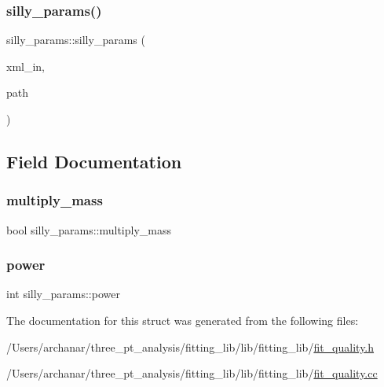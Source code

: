 \mbox{\label{structsilly__params_ac35c06fe1d98266d231e8315a2f0a5b6}} 
\subsubsection{\texorpdfstring{silly\_params()}{silly\_params()}\hspace{0.1cm}{\footnotesize\ttfamily [4/4]}}
{\footnotesize\ttfamily silly\+\_\+params\+::silly\+\_\+params (\begin{DoxyParamCaption}\item[{X\+M\+L\+Reader \&}]{xml\+\_\+in,  }\item[{const string \&}]{path }\end{DoxyParamCaption})}



\subsection{Field Documentation}
\mbox{\label{structsilly__params_a07402b5ea15bb6d424fd8f3af9baae2a}} 
\subsubsection{\texorpdfstring{multiply\_mass}{multiply\_mass}}
{\footnotesize\ttfamily bool silly\+\_\+params\+::multiply\+\_\+mass}

\mbox{\label{structsilly__params_af5e805a69bdd87303934f29015317281}} 
\subsubsection{\texorpdfstring{power}{power}}
{\footnotesize\ttfamily int silly\+\_\+params\+::power}



The documentation for this struct was generated from the following files\+:\begin{DoxyCompactItemize}
\item 
/\+Users/archanar/three\+\_\+pt\+\_\+analysis/fitting\+\_\+lib/lib/fitting\+\_\+lib/\mbox{\hyperlink{lib_2fitting__lib_2fit__quality_8h}{fit\+\_\+quality.\+h}}\item 
/\+Users/archanar/three\+\_\+pt\+\_\+analysis/fitting\+\_\+lib/lib/fitting\+\_\+lib/\mbox{\hyperlink{fit__quality_8cc}{fit\+\_\+quality.\+cc}}\end{DoxyCompactItemize}
